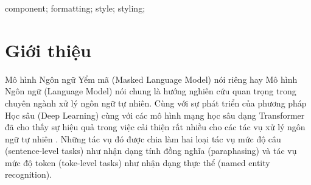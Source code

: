 \documentclass[10pt, conference, a4paper, compsocconf]{IEEEtran}
\begin{document}
%






\maketitle


\begin{abstract}

\end{abstract}

\begin{IEEEkeywords}
component; formatting; style; styling;

\end{IEEEkeywords}


%
\IEEEpeerreviewmaketitle



\section{Giới thiệu}
\label{introduction}
Mô hình Ngôn ngữ Yểm mã (Masked Language Model) nói riêng hay Mô hình Ngôn ngữ (Language Model) 
nói chung là hướng nghiên cứu quan trọng trong chuyên ngành xử lý ngôn ngữ tự nhiên. 
Cùng với sự phát triển của phương pháp Học sâu (Deep Learning) cùng với các mô hình mạng học sâu dạng Transformer\cite{Vaswani2017}
đã cho thấy sự hiệu quả trong việc cải thiện rất nhiều cho các tác vụ xử lý ngôn ngữ tự nhiên \cite{Dai2015}.
Những tác vụ đó được chia làm hai loại tác vụ mức độ câu (sentence-level tasks) như nhận dạng tính đồng nghĩa (paraphasing)
và tác vụ mức độ token (toke-level tasks) như nhận dạng thực thể (named entity recognition). 
\end{document}
